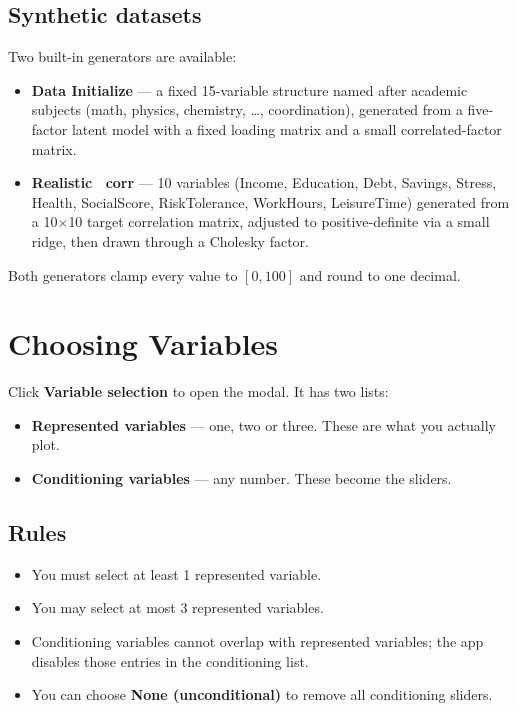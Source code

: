 \documentclass[11pt,a4paper]{article}
\begin{document}
\subsection{Synthetic datasets}

Two built-in generators are available:

\begin{itemize}[leftmargin=1.4em]
  \item \textbf{Data Initialize} --- a fixed 15-variable structure named after academic subjects (math, physics, chemistry, \dots, coordination), generated from a five-factor latent model with a fixed loading matrix and a small correlated-factor matrix.
  \item \textbf{Realistic \textpm\ corr} --- 10 variables (Income, Education, Debt, Savings, Stress, Health, SocialScore, RiskTolerance, WorkHours, LeisureTime) generated from a 10$\times$10 target correlation matrix, adjusted to positive-definite via a small ridge, then drawn through a Cholesky factor.
\end{itemize}

Both generators clamp every value to $[0, 100]$ and round to one decimal.

\section{Choosing Variables}

Click \textbf{Variable selection} to open the modal. It has two lists:

\begin{itemize}[leftmargin=1.4em]
  \item \textbf{Represented variables} --- one, two or three. These are what you actually plot.
  \item \textbf{Conditioning variables} --- any number. These become the sliders.
\end{itemize}

\subsection{Rules}

\begin{itemize}[leftmargin=1.4em]
  \item You must select at least 1 represented variable.
  \item You may select at most 3 represented variables.
  \item Conditioning variables cannot overlap with represented variables; the app disables those entries in the conditioning list.
  \item You can choose \textbf{None (unconditional)} to remove all conditioning sliders.
\end{itemize}
\end{document}
